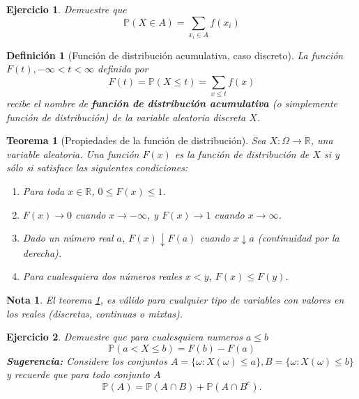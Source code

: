\documentclass[11pt]{report}
\theoremstyle{break}
\newtheorem{definicion}{Definición}[chapter]
\newtheorem{teorema}{Teorema}[chapter]
\newtheorem{nota}{Nota}[chapter]
\newtheorem{ejercicio}{Ejercicio}[chapter]
\theoremstyle{break}
\begin{document}
\begin{ejercicio}
Demuestre que 
$$
\mathbb{P}(X \in A) = \sum_{x_i \in A}f(x_i)
$$
\end{ejercicio}

\begin{definicion}[Función de distribución acumulativa, caso discreto]
\label{definicion:funcion de distribucion caso discreto}
La función $F(t), -\infty < t < \infty$ definida por
$$
F(t) = \mathbb{P}(X \leq t) = \sum_{x \leq t} f(x)
$$
recibe el nombre de \textbf{función de distribución acumulativa} (o simplemente función de distribución) de la variable aleatoria discreta $X$.
\end{definicion}

\begin{teorema}[Propiedades de la función de distribución]
\label{teorema: propiedades de la funcion de distribucion}
Sea $X:\Omega \rightarrow \mathbb{R}$, una variable aleatoria. Una función $F(x)$ es la función de distribución de $X$ si y sólo si satisface las siguientes condiciones:
\begin{enumerate}[label=\alph*)]
\item Para toda $x \in \mathbb{R}$, $0 \leq F(x) \leq 1$.
\item $F(x) \rightarrow 0$ cuando $x \rightarrow -\infty$, y  $F(x) \rightarrow 1$ cuando $x \rightarrow \infty$.
\item Dado un número real $a$, $F(x) \downarrow F(a)$ cuando $x \downarrow a$ (continuidad por la derecha).
\item Para cualesquiera dos números reales $x < y$, $F(x) \leq F(y)$.
\end{enumerate}
\end{teorema}
\begin{nota}
El teorema \ref{teorema: propiedades de la funcion de distribucion}, es válido para cualquier tipo de variables con valores en los reales (discretas, continuas o mixtas).
\end{nota}

\begin{ejercicio}
Demuestre que para cualesquiera numeros $a \leq b$
$$
\mathbb{P}(a < X \leq b) = F(b) - F(a)
$$
\textbf{Sugerencia:} Considere los conjuntos $A = \{ \omega: X(\omega) \leq a\}, B = \{\omega: X(\omega) \leq b\}$ y recuerde que para todo conjunto $A$
$$\mathbb{P}(A) = \mathbb{P}(A \cap B) + \mathbb{P}(A \cap B^c).$$
\end{ejercicio}
\end{document}
